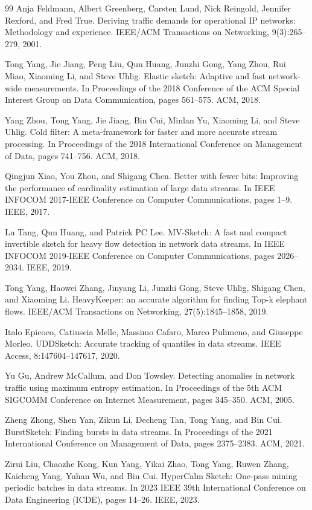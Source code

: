 \documentclass[preprint,12pt]{elsarticle}
\begin{document}
\begin{thebibliography}{99}
Anja Feldmann, Albert Greenberg, Carsten Lund, Nick Reingold, Jennifer Rexford, and Fred True. Deriving traffic demands for operational IP networks: Methodology and experience. IEEE/ACM Transactions on Networking, 9(3):265--279, 2001.

Tong Yang, Jie Jiang, Peng Liu, Qun Huang, Junzhi Gong, Yang Zhou, Rui Miao, Xiaoming Li, and Steve Uhlig. Elastic sketch: Adaptive and fast network-wide measurements. In Proceedings of the 2018 Conference of the ACM Special Interest Group on Data Communication, pages 561--575. ACM, 2018.

Yang Zhou, Tong Yang, Jie Jiang, Bin Cui, Minlan Yu, Xiaoming Li, and Steve Uhlig. Cold filter: A meta-framework for faster and more accurate stream processing. In Proceedings of the 2018 International Conference on Management of Data, pages 741--756. ACM, 2018.

Qingjun Xiao, You Zhou, and Shigang Chen. Better with fewer bits: Improving the performance of cardinality estimation of large data streams. In IEEE INFOCOM 2017-IEEE Conference on Computer Communications, pages 1--9. IEEE, 2017.

Lu Tang, Qun Huang, and Patrick PC Lee. MV-Sketch: A fast and compact invertible sketch for heavy flow detection in network data streams. In IEEE INFOCOM 2019-IEEE Conference on Computer Communications, pages 2026--2034. IEEE, 2019.

Tong Yang, Haowei Zhang, Jinyang Li, Junzhi Gong, Steve Uhlig, Shigang Chen, and Xiaoming Li. HeavyKeeper: an accurate algorithm for finding Top-k elephant flows. IEEE/ACM Transactions on Networking, 27(5):1845--1858, 2019.

Italo Epicoco, Catiuscia Melle, Massimo Cafaro, Marco Pulimeno, and Giuseppe Morleo. UDDSketch: Accurate tracking of quantiles in data streams. IEEE Access, 8:147604--147617, 2020.

Yu Gu, Andrew McCallum, and Don Towsley. Detecting anomalies in network traffic using maximum entropy estimation. In Proceedings of the 5th ACM SIGCOMM Conference on Internet Measurement, pages 345--350. ACM, 2005.

Zheng Zhong, Shen Yan, Zikun Li, Decheng Tan, Tong Yang, and Bin Cui. BurstSketch: Finding bursts in data streams. In Proceedings of the 2021 International Conference on Management of Data, pages 2375--2383. ACM, 2021.

Zirui Liu, Chaozhe Kong, Kun Yang, Yikai Zhao, Tong Yang, Ruwen Zhang, Kaicheng Yang, Yuhan Wu, and Bin Cui. HyperCalm Sketch: One-pass mining periodic batches in data streams. In 2023 IEEE 39th International Conference on Data Engineering (ICDE), pages 14--26. IEEE, 2023.


\end{thebibliography}
\end{document}
